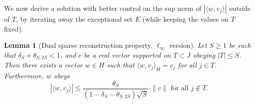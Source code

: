 \documentclass[11pt]{article}
\newcommand{\<}{\langle}
\renewcommand{\>}{\rangle}
\newtheorem{lemma}[theorem]{Lemma}
\numberwithin{equation}{section}
\begin{document}
We now derive a solution with better control on the sup norm of $|\<
w, v_j\>|$ outside of $T$, by iterating away the exceptional set $E$
(while keeping the values on $T$ fixed).

\begin{lemma}[Dual sparse reconstruction property, $\ell_\infty$ version]
\label{erp-3} 
Let $S \geq 1$ be such that $\delta_S + \theta_{S,2S} < 1$, and $c$ be
a real vector supported on $T \subset J$ obeying $|T| \le S$. Then
there exists a vector $w \in H$ such that $\langle w, v_j \rangle_H =
c_j$ for all $j \in T$.  Furthermore, $w$ obeys
\begin{equation}
  \label{eq:erp-3}
|\langle w, v_j \rangle| \leq \frac{\theta_S}{(1 - \delta_S -
  \theta_{S,2S}) \sqrt{S}} \cdot \|c\| \text{ for all } j \not \in
T.
\end{equation}
\end{lemma}
\end{document}
